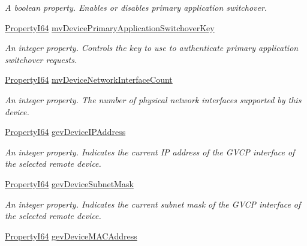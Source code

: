 \begin{DoxyCompactItemize}
\begin{DoxyCompactList}\small\item\em A boolean property. Enables or disables primary application switchover. \end{DoxyCompactList}\item 
\hyperlink{group___common_interface_ga81749b2696755513663492664a18a893}{Property\+I64} \hyperlink{classmv_i_m_p_a_c_t_1_1acquire_1_1_gen_i_cam_1_1_interface_module_a3f91c3df402ffff61dcf0f896d2cc4cf}{mv\+Device\+Primary\+Application\+Switchover\+Key}
\begin{DoxyCompactList}\small\item\em An integer property. Controls the key to use to authenticate primary application switchover requests. \end{DoxyCompactList}\item 
\hyperlink{group___common_interface_ga81749b2696755513663492664a18a893}{Property\+I64} \hyperlink{classmv_i_m_p_a_c_t_1_1acquire_1_1_gen_i_cam_1_1_interface_module_a5e4bcdfcb02cc2ce0b47b35def64ae92}{mv\+Device\+Network\+Interface\+Count}
\begin{DoxyCompactList}\small\item\em An integer property. The number of physical network interfaces supported by this device. \end{DoxyCompactList}\item 
\hyperlink{group___common_interface_ga81749b2696755513663492664a18a893}{Property\+I64} \hyperlink{classmv_i_m_p_a_c_t_1_1acquire_1_1_gen_i_cam_1_1_interface_module_ab8905756d4203a9e8ac90528899a67d1}{gev\+Device\+I\+P\+Address}
\begin{DoxyCompactList}\small\item\em An integer property. Indicates the current I\+P address of the G\+V\+C\+P interface of the selected remote device. \end{DoxyCompactList}\item 
\hyperlink{group___common_interface_ga81749b2696755513663492664a18a893}{Property\+I64} \hyperlink{classmv_i_m_p_a_c_t_1_1acquire_1_1_gen_i_cam_1_1_interface_module_a2365b591ab9a6225fd368641112f95f9}{gev\+Device\+Subnet\+Mask}
\begin{DoxyCompactList}\small\item\em An integer property. Indicates the current subnet mask of the G\+V\+C\+P interface of the selected remote device. \end{DoxyCompactList}\item 
\hyperlink{group___common_interface_ga81749b2696755513663492664a18a893}{Property\+I64} \hyperlink{classmv_i_m_p_a_c_t_1_1acquire_1_1_gen_i_cam_1_1_interface_module_a818081268a11698a5568ed40d8debe3b}{gev\+Device\+M\+A\+C\+Address}

\end{DoxyCompactItemize}
